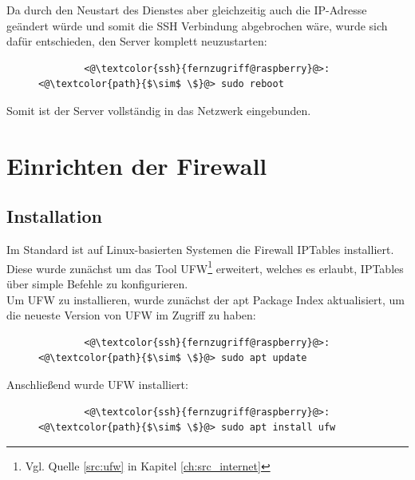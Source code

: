 \documentclass[a4paper, 11pt]{scrartcl}
\begin{document}
Da durch den Neustart des Dienstes aber gleichzeitig auch die IP-Adresse geändert würde und somit die SSH Verbindung abgebrochen wäre, wurde sich dafür entschieden,
den Server komplett neuzustarten:
\begin{figure}[H]
    \begin{mdframed}[backgroundcolor=bbg]
        \begin{lstlisting}
        <@\textcolor{ssh}{fernzugriff@raspberry}@>:<@\textcolor{path}{$\sim$ \$}@> sudo reboot
        \end{lstlisting}
    \end{mdframed}
    \label{lst:restart_raspi}
\end{figure}
Somit ist der Server vollständig in das Netzwerk eingebunden.



\section{Einrichten der Firewall}
\subsection{Installation}\label{ch:firewall_inst}
Im Standard ist auf Linux-basierten Systemen die Firewall IPTables installiert. Diese wurde zunächst um das Tool \glqq UFW\grqq{}\footnote{Vgl. Quelle \ref{src:ufw} in Kapitel \ref{ch:src_internet}}
erweitert, welches es erlaubt, IPTables über simple Befehle zu konfigurieren.
\\
Um UFW zu installieren, wurde zunächst der apt Package Index aktualisiert, um die neueste Version von UFW im Zugriff zu haben:
\begin{figure}[H]
    \begin{mdframed}[backgroundcolor=bbg]
        \begin{lstlisting}
        <@\textcolor{ssh}{fernzugriff@raspberry}@>:<@\textcolor{path}{$\sim$ \$}@> sudo apt update
        \end{lstlisting}
    \end{mdframed}
    \label{lst:update_apt}
\end{figure}
Anschließend wurde UFW installiert:
\begin{figure}[H]
    \begin{mdframed}[backgroundcolor=bbg]
        \begin{lstlisting}
        <@\textcolor{ssh}{fernzugriff@raspberry}@>:<@\textcolor{path}{$\sim$ \$}@> sudo apt install ufw
        \end{lstlisting}
    \end{mdframed}
    \label{lst:install_ufw}
\end{figure}
\end{document}
